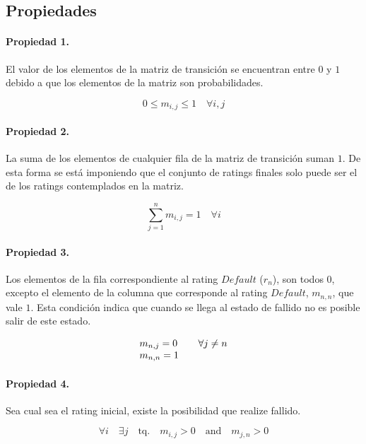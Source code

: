 \subsection{Propiedades}

\paragraph{Propiedad 1.}
El valor de los elementos de la matriz de transici\'on se encuentran entre $0$ 
y $1$ debido a que los elementos de la matriz son probabilidades.

\begin{displaymath}
0 \leq m_{i,j} \leq 1 \quad \forall i,j
\end{displaymath}

\paragraph{Propiedad 2.}
La suma de los elementos de cualquier fila de la matriz de transici\'on suman $1$.
De esta forma se  est\'a imponiendo que el conjunto de ratings finales solo puede 
ser el de los ratings contemplados en la matriz.

\begin{displaymath}
\sum_{j=1}^{n} m_{i,j} = 1 \quad \forall i
\end{displaymath}

\paragraph{Propiedad 3.}
Los elementos de la fila correspondiente al rating $Default$ ($r_n$), son todos 
$0$, excepto el elemento de la columna que corresponde al rating $Default$, 
$m_{n,n}$, que vale $1$. Esta condici\'on indica que cuando se llega al estado 
de fallido no es posible salir de este estado.

\begin{displaymath}
\begin{array}{ll}
m_{n,j} = 0        & \quad \forall j \neq n \cr
m_{n,n} = 1
\end{array}
\end{displaymath}

\paragraph{Propiedad 4.}
Sea cual sea el rating inicial, existe la posibilidad que realize fallido.

\begin{displaymath}
\forall i \quad \exists j \quad \textrm{tq.} \quad m_{i,j} > 0 \quad \textrm{and} \quad  m_{j,n} > 0
\end{displaymath}


